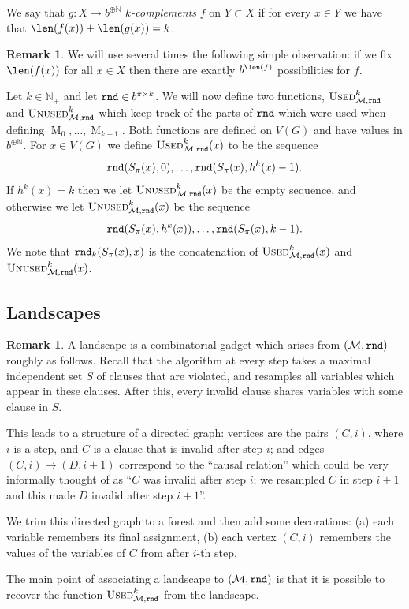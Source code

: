 \documentclass[12pt,a4paper]{article}
\numberwithin{equation}{section}
\theoremstyle{definition}
\newtheorem{remark}[equation]{Remark}
\newenvironment{myrem}{%
        \begin{mdframed}[%
            linewidth=4pt, 
            topline=false, 
            bottomline=false, 
            rightline=false,%
            leftmargin=0pt, 
            innerleftmargin=0.4em, 
            rightmargin=0pt, 
            innerrightmargin=0pt, 
            innertopmargin=0pt ,%
            innerbottommargin=0pt, 
            splittopskip=\topskip, 
            splitbottomskip=0.3\topskip, %
            ]%
        \begin{remark}
    }{%
        \end{remark}
        \end{mdframed}
    }
\newcommand\NN{\mathbb N}
\renewcommand{\cal}[1]{{\mathcal #1}}
\newcommand\MT{\operatorname{M}}
\newcommand{\used}{\textsc{Used}}
\newcommand{\unused}{\textsc{Unused}}
\begin{document}
    
    We say that $g\colon X\to b^{\oplus \NN}$  \emph{$k$-complements} $f$ on $Y\subset X$ if for every $x\in Y$ we have  that $\len(f(x))+\len(g(x))  =k$. 
    
    \begin{myrem}\label{rem-lengths}
    We will use several times the following simple observation: if we fix $\len(f(x))$ for all $x\in X$ then there are exactly $b^{\len(f)}$ possibilities for $f$. 
    \end{myrem}
    
    Let $k\in \NN_+$ and let $\normalfont{\texttt{rnd}}\in b^{\pi\times k}$. We will now define 
    two functions, $\used^k_{\cal M,\rnd}$  and $\unused^k_{\cal M, \rnd}$ 
    which keep track of the parts of $\normalfont{\texttt{rnd}}$ which were used when defining 
    $\MT_0,\ldots, \MT_{k-1}$. Both functions are defined on $V(G)$ and have 
    values in $b^{\oplus \NN}$. For $x\in V(G)$ we define 
    $\used^k_{\cal M,\rnd}(x)$ to be the sequence 
    $$
        \normalfont{\texttt{rnd}}(S_\pi(x),0),\ldots, \normalfont{\texttt{rnd}}(S_\pi(x),h^{k}(x)-1).
    $$
    If $h^{k}(x)=k$ then we let $\unused^k_{\cal M,\rnd}(x)$ be the empty sequence, and otherwise we let $\unused^k_{\cal M,\rnd}(x)$ be the sequence 
    $$
        \normalfont{\texttt{rnd}}(S_\pi(x), h^{k}(x)),\ldots, \normalfont{\texttt{rnd}}(S_\pi(x),k-1).
    $$
    We note that $\normalfont{\texttt{rnd}}_k(S_\pi(x),x)$ is the concatenation of $\used^k_{\cal M,\rnd}(x)$ and $\unused^k_{\cal M,\rnd}(x)$.
    
    \subsection{Landscapes}\mbox{}
    
    
    \begin{myrem} A landscape is a combinatorial gadget which arises from $(\cal M,\rnd)$  roughly as follows. 
    Recall that the algorithm at every step takes a maximal independent set $S$ of 
    clauses that are violated, and resamples all variables which appear in 
    these clauses. After this, every invalid clause shares variables with some clause in $S$.
    
    This leads to a structure of a directed graph: vertices are the pairs $(C,i)$, where $i$ is a step, and 
    $C$ is a clause that is invalid after step $i$; and edges 
    $(C,i)\to (D,i+1)$ correspond to the ``causal relation'' which could 
    be very informally thought of as ``$C$ was invalid after step $i$; we resampled $C$ in step $i+1$ and this made $D$ invalid after step $i+1$''.
    
    We trim this directed graph to a forest and then add some decorations: (a) each variable remembers its final assignment, (b) each vertex $(C,i)$ remembers the values of the variables of $C$ from after $i$-th step. 
    
    The main point of associating a landscape to $(\cal M,\rnd)$ is that it is possible to recover the function $\used^k_{\cal M,\rnd}$ from the landscape.
    \end{myrem}
    
\end{document}
